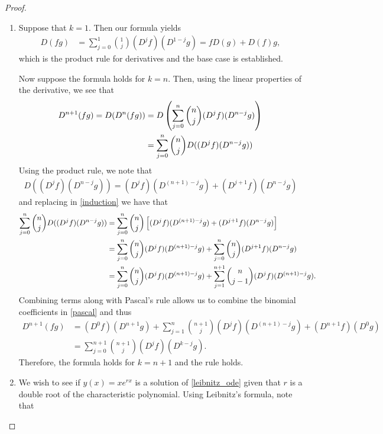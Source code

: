 \documentclass[12pt]{article}
\theoremstyle{definition}
\begin{document}
\begin{proof}
  \begin{enumerate}
    \item Suppose that $k=1$. Then our formula yields
      \begin{align*}
        D(fg) &= \sum_{j=0}^1 \binom{1}{j}(D^j f) (D^{1-j}g) = fD(g) + D(f)g,
      \end{align*}
      which is the product rule for derivatives and the base case is established.

      Now suppose the formula holds for $k=n$. Then, using the linear properties of the derivative, we see that
      \begin{align}\label{induction}
        D^{n+1}(fg) = D(D^{n}(fg)) &= D\left(\sum_{j=0}^n \binom{n}{j}(D^j f) (D^{n-j}g)\right) \notag\\
        &=\sum_{j=0}^n \binom{n}{j}D((D^j f) (D^{n-j}g))
      \end{align}
      Using the product rule, we note that
      \begin{align*}
        D((D^j f) (D^{n-j}g)) = (D^j f) (D^{(n + 1)-j}g) + (D ^{j+1}f)(D^{n-j}g)
      \end{align*}
      and replacing in \eqref{induction} we have that
      \begin{align}\label{pascal}
        \sum_{j=0}^n \binom{n}{j}D((D^j f) (D^{n-j}g)) \notag
        &= \sum_{j=0}^n \binom{n}{j} \left[(D^j f) (D^{(n + 1)-j}g) + (D ^{j+1}f)(D^{n-j}g)\right] \notag\\
        &= \sum_{j=0}^n \binom{n}{j} (D^j f) (D^{(n + 1)-j}g) + \sum_{j=0}^n \binom{n}{j} (D ^{j+1}f)(D^{n-j}g) \notag\\
        &= \sum_{j=0}^n \binom{n}{j} (D^j f) (D^{(n + 1)-j}g) + \sum_{j=1}^{n+1} \binom{n}{j-1} (D ^{j}f)(D^{(n+1)-j}g).
      \end{align}
      Combining terms along with Pascal's rule allows us to combine the binomial coefficients in \eqref{pascal} and thus
      \begin{align*}
        D^{n+1}(fg) &= (D^0f) (D^{n+1}g) + \sum_{j=1}^{n} \binom{n+1}{j}(D^j f) (D^{(n + 1)-j}g) + (D^{n+1}f) (D^0g) \\
        &= \sum_{j=0}^{n+1} \binom{n+1}{j}(D^j f) (D^{k-j}g).
      \end{align*}
      Therefore, the formula holds for $k=n+1$ and the rule holds.
    \item We wish to see if $y(x) = x e^{rx}$ is a solution of \eqref{leibnitz_ode} given
      that $r$ is a double root of the characteristic polynomial. Using Leibnitz's formula, note that

\end{enumerate}
\end{proof}
\end{document}
